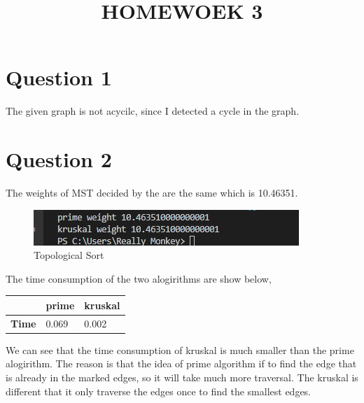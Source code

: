 \documentclass[conference]{IEEEtran}
\begin{document}
\title{HOMEWOEK 3}

\author{
}

\maketitle

\section*{Question 1}
The given graph is not acycilc, since I detected a cycle in the graph. 

\section*{Question 2}
The weights of MST decided by the are the same which is 10.46351.

\begin{figure}[H]
    \centerline{\includegraphics[scale=0.8]{pic/pic2.png}}
    \caption{Topological Sort}
\end{figure}

The time consumption of the two alogirithms are show below,

\begin{table}[H]
    \begin{center}
        \begin{tabular}{|l|l|l|}
            \hline
            \textbf{}     & prime & kruskal \\ \hline
            \textbf{Time} & 0.069 & 0.002   \\ \hline
            \end{tabular}
    \end{center}
\end{table}

We can see that the time consumption of kruskal is much smaller than 
the prime alogirithm. The reason is that the idea of prime algorithm 
if to find the edge that is already in the marked edges, so it will 
take much more traversal. The kruskal is different that it only traverse 
the edges once to find the smallest edges.
\end{document}
